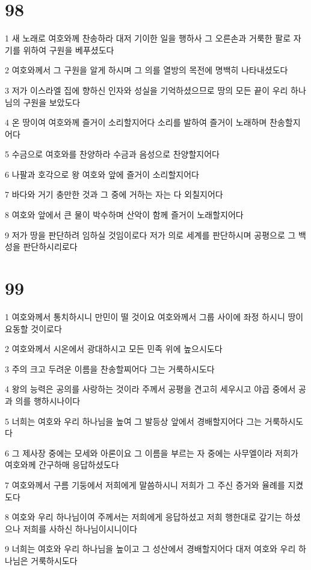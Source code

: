 \chapter{98}

\par 1 새 노래로 여호와께 찬송하라 대저 기이한 일을 행하사 그 오른손과 거룩한 팔로 자기를 위하여 구원을 베푸셨도다
\par 2 여호와께서 그 구원을 알게 하시며 그 의를 열방의 목전에 명백히 나타내셨도다
\par 3 저가 이스라엘 집에 향하신 인자와 성실을 기억하셨으므로 땅의 모든 끝이 우리 하나님의 구원을 보았도다
\par 4 온 땅이여 여호와께 즐거이 소리할지어다 소리를 발하여 즐거이 노래하며 찬송할지어다
\par 5 수금으로 여호와를 찬양하라 수금과 음성으로 찬양할지어다
\par 6 나팔과 호각으로 왕 여호와 앞에 즐거이 소리할지어다
\par 7 바다와 거기 충만한 것과 그 중에 거하는 자는 다 외칠지어다
\par 8 여호와 앞에서 큰 물이 박수하며 산악이 함께 즐거이 노래할지어다
\par 9 저가 땅을 판단하려 임하실 것임이로다 저가 의로 세계를 판단하시며 공평으로 그 백성을 판단하시리로다

\chapter{99}

\par 1 여호와께서 통치하시니 만민이 떨 것이요 여호와께서 그룹 사이에 좌정 하시니 땅이 요동할 것이로다
\par 2 여호와께서 시온에서 광대하시고 모든 민족 위에 높으시도다
\par 3 주의 크고 두려운 이름을 찬송할찌어다 그는 거룩하시도다
\par 4 왕의 능력은 공의를 사랑하는 것이라 주께서 공평을 견고히 세우시고 야곱 중에서 공과 의를 행하시나이다
\par 5 너희는 여호와 우리 하나님을 높여 그 발등상 앞에서 경배할지어다 그는 거룩하시도다
\par 6 그 제사장 중에는 모세와 아론이요 그 이름을 부르는 자 중에는 사무엘이라 저희가 여호와께 간구하매 응답하셨도다
\par 7 여호와께서 구름 기둥에서 저희에게 말씀하시니 저희가 그 주신 증거와 율례를 지켰도다
\par 8 여호와 우리 하나님이여 주께서는 저희에게 응답하셨고 저희 행한대로 갚기는 하셨으나 저희를 사하신 하나님이시니이다
\par 9 너희는 여호와 우리 하나님을 높이고 그 성산에서 경배할지어다 대저 여호와 우리 하나님은 거룩하시도다

